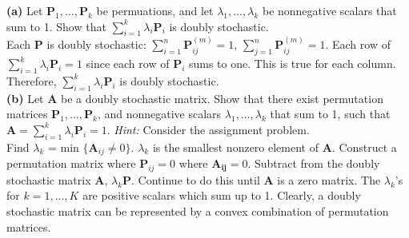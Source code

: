 \documentclass{article}
\begin{document}
\noindent \textbf{(a)}
Let $\mathbf{P}_1, \ldots, \mathbf{P}_k$ be permuations, and let $\lambda_1, \ldots, \lambda_k$ be nonnegative scalars that sum to 1.  Show that $\sum_{i=1}^k \lambda_i \mathbf{P}_i$ is doubly stochastic. \\

\noindent
Each $\mathbf{P}$ is doubly stochastic:  $\displaystyle \sum_{i=1}^n \mathbf{P}_{ij}^{(m)} = 1$, $\displaystyle \sum_{j=1}^n \mathbf{P}_{ij}^{(m)} = 1$.  Each row of $\displaystyle \sum_{i=1}^k \lambda_i \mathbf{P}_i = 1$ since each row of $\mathbf{P}_i$ sums to one.  This is true for each column.  Therefore, $\displaystyle \sum_{i=1}^k \lambda_i \mathbf{P}_i$ is doubly stochastic. \\

\noindent \textbf{(b)}
Let $\mathbf{A}$ be a doubly stochastic matrix.  Show that there exist permutation matrices $\mathbf{P}_1, \ldots, \mathbf{P}_k$, and nonnegative scalars $\lambda_1, \ldots, \lambda_k$ that sum to 1, such that $\mathbf{A} = \sum_{i=1}^k \lambda_i \mathbf{P}_i = 1$.  \emph{Hint:} Consider the assignment problem. \\

\noindent
Find $\lambda_k$ = min $\{ \mathbf{A}_{ij} \neq 0\}$.  $\lambda_k$ is the smallest nonzero element of $\mathbf{A}$.  Construct a permutation matrix where $\mathbf{P}_{ij} = 0$ where $\mathbf{A_{ij}}=0$.  Subtract from the doubly stochastic matrix $\mathbf{A}$, $\lambda_k \mathbf{P}$.  Continue to do this until $\mathbf{A}$ is a zero matrix.  The $\lambda_k$'s for $k = 1, \ldots, K$ are positive scalars which sum up to 1.  Clearly, a doubly stochastic matrix can be represented by a convex combination of permutation matrices.\\ 
\end{document}

